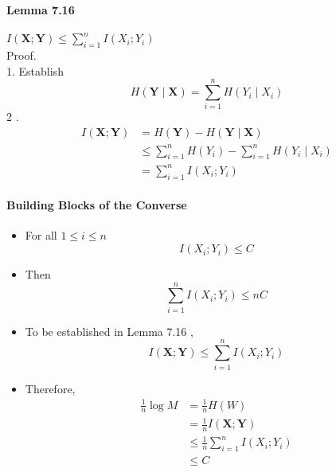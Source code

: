 \documentclass[8pt]{article}
\begin{document}
\paragraph{Lemma 7.16} $I(\mathbf{X} ; \mathbf{Y}) \leq \sum_{i=1}^{n} I\left(X_{i} ; Y_{i}\right)$\\
Proof.\\
1. Establish
$$
H(\mathbf{Y} \mid \mathbf{X})=\sum_{i=1}^{n} H\left(Y_{i} \mid X_{i}\right)
$$
2 .
$$
\begin{aligned}
I(\mathbf{X} ; \mathbf{Y}) &=H(\mathbf{Y})-H(\mathbf{Y} \mid \mathbf{X}) \\
& \leq \sum_{i=1}^{n} H\left(Y_{i}\right)-\sum_{i=1}^{n} H\left(Y_{i} \mid X_{i}\right) \\
&=\sum_{i=1}^{n} I\left(X_{i} ; Y_{i}\right)
\end{aligned}
$$

\paragraph{Building Blocks of the Converse}
\begin{itemize}
	\item For all $1 \leq i \leq n$
$$
I\left(X_{i} ; Y_{i}\right) \leq C
$$
\item Then
$$
\sum_{i=1}^{n} I\left(X_{i} ; Y_{i}\right) \leq n C
$$
\item To be established in Lemma 7.16 ,
$$
I(\mathbf{X} ; \mathbf{Y}) \leq \sum_{i=1}^{n} I\left(X_{i} ; Y_{i}\right)
$$
\item Therefore,
$$
\begin{aligned}
\frac{1}{n} \log M &=\frac{1}{n} H(W) \\
&=\frac{1}{n} I(\mathbf{X} ; \mathbf{Y}) \\
& \leq \frac{1}{n} \sum_{i=1}^{n} I\left(X_{i} ; Y_{i}\right) \\
& \leq C
\end{aligned}
$$
\end{itemize}
\end{document}
